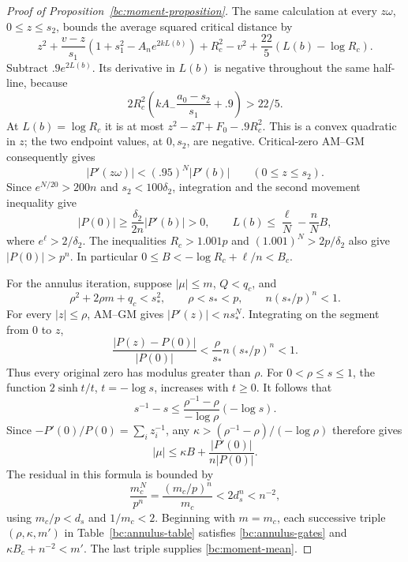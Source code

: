 \begin{proof}[Proof of Proposition~\ref{bc:moment-proposition}]
The same calculation at every $z\omega$, $0\leq z\leq s_2$, bounds
the average squared critical distance by
\[
 z^2+\frac{v-z}{s_1}(1+s_1^2-A_ne^{2kL(b)})+R_c^2-v^2
       +\frac{22}5(L(b)-\log R_c).
\]
Subtract $.9e^{2L(b)}$.  Its derivative in $L(b)$ is negative
throughout the same half-line, because
\[
 2R_c^2\left(kA_-\frac{a_0-s_2}{s_1}+.9\right)>22/5.
\]
At $L(b)=\log R_c$ it is at most
$z^2-zT+F_0-.9R_c^2$.  This is a convex quadratic in $z$;
the two endpoint values, at $0,s_2$, are negative.
Critical-zero AM--GM consequently gives
\begin{equation}\label{bc:primitive-decay}
 |P'(z\omega)|<(.95)^N|P'(b)|\qquad(0\leq z\leq s_2).
\end{equation}
Since $e^{N/20}>200n$ and $s_2<100\delta_2$, integration and the
second movement inequality give
\begin{equation}\label{bc:normalization}
 |P(0)|\geq\frac{\delta_2}{2n}|P'(b)|>0,
 \qquad
 L(b)\leq\frac\ell N-\frac nN B,
\end{equation}
where $e^\ell>2/\delta_2$.  The inequalities
$R_c>1.001p$ and $(1.001)^N>2p/\delta_2$ also give
$|P(0)|>p^n$.  In particular
$0\leq B< -\log R_c+\ell/n<B_c$.

For the annulus iteration, suppose $|\mu|\leq m$,
$Q<q_c$, and
\begin{equation}\label{bc:annulus-gates}
 \rho^2+2\rho m+q_c<s_*^2,\qquad
 \rho<s_*<p,\qquad n(s_*/p)^n<1.
\end{equation}
For every $|z|\leq\rho$, AM--GM gives
$|P'(z)|<ns_*^{N}$.  Integrating on the segment from $0$ to $z$,
\[
 \frac{|P(z)-P(0)|}{|P(0)|}
 <\frac\rho{s_*}n(s_*/p)^n<1.
\]
Thus every original zero has modulus greater than $\rho$.
For $0<\rho\leq s\leq1$, the function
$2\sinh t/t$, $t=-\log s$, increases with $t\geq0$.
It follows that
\[
 s^{-1}-s\leq
 \frac{\rho^{-1}-\rho}{-\log\rho}(-\log s).
\]
Since $-P'(0)/P(0)=\sum_i z_i^{-1}$, any
$\kappa>(\rho^{-1}-\rho)/(-\log\rho)$ therefore gives
\begin{equation}\label{bc:reciprocal-mean}
 |\mu|\leq\kappa B+
 \frac{|P'(0)|}{n|P(0)|}.
\end{equation}
The residual in this formula is bounded by
\[
 \frac{m_c^N}{p^n}=\frac{(m_c/p)^n}{m_c}<2d_s^n<n^{-2},
\]
using $m_c/p<d_s$ and $1/m_c<2$.
Beginning with $m=m_c$,
each successive triple $(\rho,\kappa,m')$ in
Table~\ref{bc:annulus-table} satisfies \eqref{bc:annulus-gates}
and $\kappa B_c+n^{-2}<m'$.  The last triple supplies
\eqref{bc:moment-mean}.


\end{proof}
